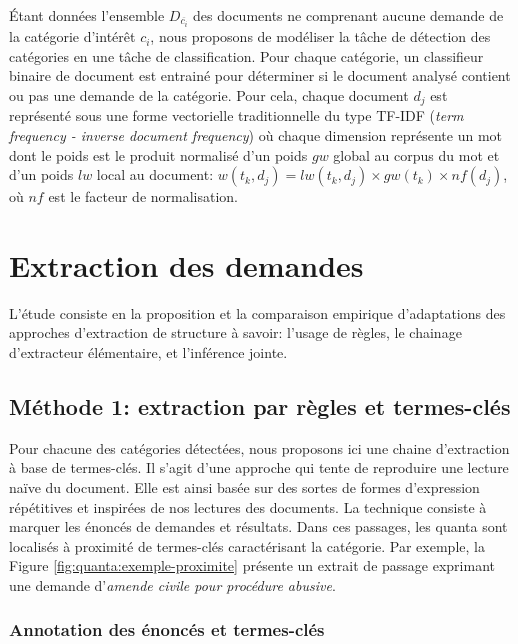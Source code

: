 Étant données l'ensemble $D_{\overline{c_i}}$ des documents ne comprenant aucune demande de la catégorie d'intérêt $c_i$, nous proposons de modéliser la tâche de détection des catégories en une tâche de classification. Pour chaque catégorie, un classifieur binaire de document est entrainé pour déterminer si le document analysé contient ou pas une demande de la catégorie. Pour cela, chaque document $d_j$ est représenté sous une forme vectorielle traditionnelle du type TF-IDF (\textit{term frequency - inverse document frequency}) où chaque dimension représente un mot dont le poids est le produit normalisé d'un poids $gw$ global au corpus du mot et d'un poids $lw$ local au document: $w(t_k, d_j) = lw(t_k, d_j) \times gw(t_k) \times nf(d_j)$, où $nf$ est le facteur de normalisation. 


\section{Extraction des demandes}
\label{sec:quanta:attributs}

L'étude consiste en la proposition et la comparaison empirique d'adaptations des approches d'extraction de structure à savoir: l'usage de règles, le chainage d'extracteur élémentaire, et l'inférence jointe.


\subsection{Méthode 1: extraction par règles et termes-clés}
\label{subsec:quanta:attributs:regles}

Pour chacune des catégories détectées, nous proposons ici une chaine d'extraction à base de termes-clés. Il s'agit d'une approche qui tente de reproduire une lecture naïve du document. Elle est ainsi basée sur des sortes de formes d'expression répétitives et inspirées de nos lectures des documents. La technique consiste à marquer les énoncés de demandes et résultats. Dans ces passages, les quanta sont localisés à proximité de termes-clés caractérisant la catégorie. Par exemple, la Figure \ref{fig:quanta:exemple-proximite} présente un extrait de passage exprimant une demande d'\textit{amende civile pour procédure abusive}.

\subsubsection{Annotation des énoncés et termes-clés}

